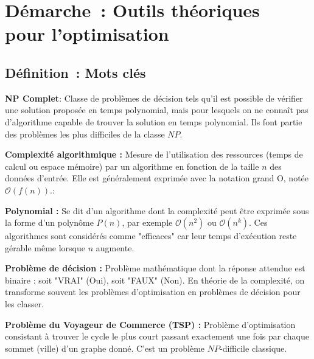 \newpage
\section*{Démarche~: Outils théoriques \\ pour l'optimisation}

\subsection*{Définition~: Mots clés}
{}

\noindent \textbf{NP Complet}: Classe de problèmes de décision tels qu'il est possible de vérifier une solution proposée en temps polynomial, mais pour lesquels on ne connaît pas d'algorithme capable de trouver la solution en temps polynomial. Ils font partie des problèmes les plus difficiles de la classe $NP$.

\vspace{0.5cm}

\noindent \textbf{Complexité algorithmique :} Mesure de l'utilisation des ressources (temps de calcul ou espace mémoire) par un algorithme en fonction de la taille $n$ des données d'entrée. Elle est généralement exprimée avec la notation grand O, notée $\mathcal{O}(f(n))$.:

\vspace{0.5cm}

\noindent \textbf{Polynomial :} Se dit d'un algorithme dont la complexité peut être exprimée sous la forme d'un polynôme $P(n)$, par exemple $\mathcal{O}(n^2)$ ou $\mathcal{O}(n^k)$. Ces algorithmes sont considérés comme "efficaces" car leur temps d'exécution reste gérable même lorsque $n$ augmente.

\vspace{0.5cm}

 \noindent \textbf{Problème de décision :} Problème mathématique dont la réponse attendue est binaire : soit "VRAI" (Oui), soit "FAUX" (Non). En théorie de la complexité, on transforme souvent les problèmes d'optimisation en problèmes de décision pour les classer.

\vspace{0.5cm}

\noindent \textbf{Problème du Voyageur de Commerce (TSP) :} Problème d'optimisation consistant à trouver le cycle le plus court passant exactement une fois par chaque sommet (ville) d'un graphe donné. C'est un problème $NP$-difficile classique.


